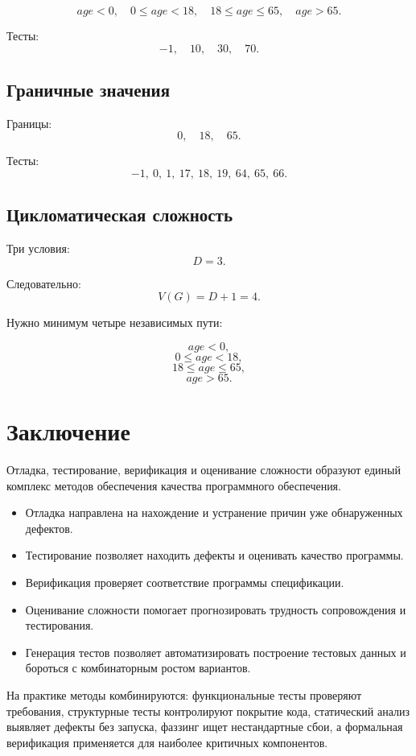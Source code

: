 \documentclass[12pt,a4paper]{article}
\begin{document}
\[
age < 0,\quad 0 \leq age < 18,\quad 18 \leq age \leq 65,\quad age > 65.
\]

Тесты:
\[
-1,\quad 10,\quad 30,\quad 70.
\]

\subsection{Граничные значения}

Границы:
\[
0,\quad 18,\quad 65.
\]

Тесты:
\[
-1,\ 0,\ 1,\ 17,\ 18,\ 19,\ 64,\ 65,\ 66.
\]

\subsection{Цикломатическая сложность}

Три условия:
\[
D=3.
\]

Следовательно:
\[
V(G)=D+1=4.
\]

Нужно минимум четыре независимых пути:

\[
age<0,
\]
\[
0\leq age<18,
\]
\[
18\leq age\leq65,
\]
\[
age>65.
\]

\section{Заключение}

Отладка, тестирование, верификация и оценивание сложности образуют единый комплекс методов обеспечения качества программного обеспечения.

\begin{itemize}
    \item Отладка направлена на нахождение и устранение причин уже обнаруженных дефектов.
    \item Тестирование позволяет находить дефекты и оценивать качество программы.
    \item Верификация проверяет соответствие программы спецификации.
    \item Оценивание сложности помогает прогнозировать трудность сопровождения и тестирования.
    \item Генерация тестов позволяет автоматизировать построение тестовых данных и бороться с комбинаторным ростом вариантов.
\end{itemize}

На практике методы комбинируются: функциональные тесты проверяют требования, структурные тесты контролируют покрытие кода, статический анализ выявляет дефекты без запуска, фаззинг ищет нестандартные сбои, а формальная верификация применяется для наиболее критичных компонентов.
\end{document}
